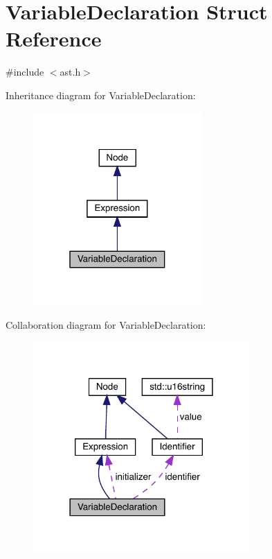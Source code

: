 \hypertarget{struct_variable_declaration}{}\section{Variable\+Declaration Struct Reference}
\label{struct_variable_declaration}


{\ttfamily \#include $<$ast.\+h$>$}



Inheritance diagram for Variable\+Declaration\+:\nopagebreak
\begin{figure}[H]
\begin{center}
\leavevmode
\includegraphics[width=183pt]{struct_variable_declaration__inherit__graph}
\end{center}
\end{figure}


Collaboration diagram for Variable\+Declaration\+:\nopagebreak
\begin{figure}[H]
\begin{center}
\leavevmode
\includegraphics[width=234pt]{struct_variable_declaration__coll__graph}
\end{center}
\end{figure}
